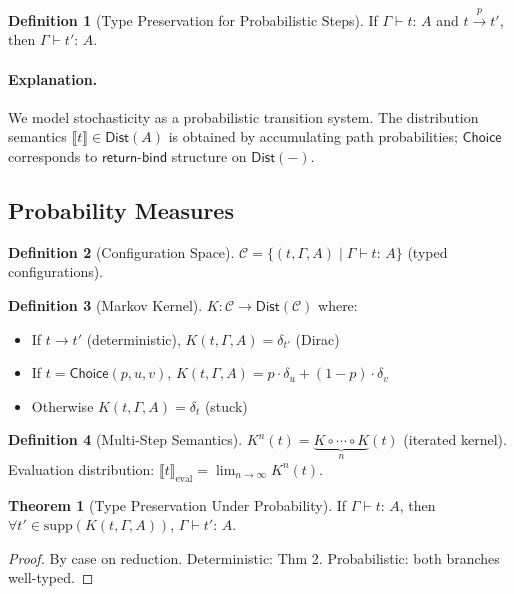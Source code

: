 \documentclass[12pt]{article}
\newcommand{\Entails}{\vdash}
\newcommand{\Types}{:\,}
\newcommand{\Choice}{\mathsf{Choice}}
\newcommand{\Ctx}{\Gamma}
\newcommand{\Dist}[1]{\mathsf{Dist}(#1)}
\newcommand{\Interp}[1]{\llbracket #1 \rrbracket}
\newcommand{\step}{\rightarrow}
\newcommand{\pstep}[1]{\xrightarrow{#1}}
\theoremstyle{definition}
\newtheorem{definition}{Definition}
\newtheorem{theorem}{Theorem}
\begin{document}
\begin{definition}[Type Preservation for Probabilistic Steps]
If $\Ctx \Entails t \Types A$ and $t \pstep{p} t'$, then $\Ctx \Entails t' \Types A$.
\end{definition}

\paragraph{Explanation.}
We model stochasticity as a probabilistic transition system. The distribution semantics $\Interp{t} \in \Dist{A}$ is obtained by accumulating path probabilities; $\Choice$ corresponds to $\mathsf{return}$-$\mathsf{bind}$ structure on $\Dist{-}$.

\subsection{Probability Measures}
\begin{definition}[Configuration Space]
$\mathcal{C} = \{(t, \Ctx, A) \mid \Ctx \Entails t \Types A\}$ (typed configurations).
\end{definition}

\begin{definition}[Markov Kernel]
$K : \mathcal{C} \to \Dist{\mathcal{C}}$ where:
\begin{itemize}
\item If $t \step t'$ (deterministic), $K(t,\Ctx,A) = \delta_{t'}$ (Dirac)
\item If $t = \Choice(p,u,v)$, $K(t,\Ctx,A) = p \cdot \delta_u + (1-p) \cdot \delta_v$
\item Otherwise $K(t,\Ctx,A) = \delta_t$ (stuck)
\end{itemize}
\end{definition}

\begin{definition}[Multi-Step Semantics]
$K^n(t) = \underbrace{K \circ \cdots \circ K}_{n}(t)$ (iterated kernel).
Evaluation distribution: $\Interp{t}_{\text{eval}} = \lim_{n\to\infty} K^n(t)$.
\end{definition}

\begin{theorem}[Type Preservation Under Probability]
If $\Ctx \Entails t \Types A$, then $\forall t' \in \text{supp}(K(t,\Ctx,A))$, $\Ctx \Entails t' \Types A$.
\end{theorem}
\begin{proof}
By case on reduction. Deterministic: Thm 2. Probabilistic: both branches well-typed.
\end{proof}
\end{document}
